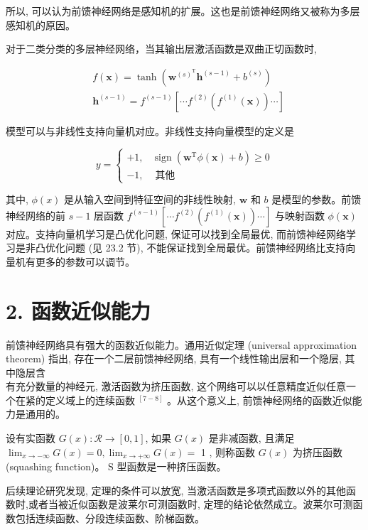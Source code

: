 \documentclass[10pt]{article}
\begin{document}
\begin{CJK*}{UTF8}{bsmi}
所以, 可以认为前馈神经网络是感知机的扩展。这也是前馈神经网络又被称为多层感知机的原因。

对于二类分类的多层神经网络，当其输出层激活函数是双曲正切函数时,


\begin{align*}
& f(\boldsymbol{x})=\tanh \left(\boldsymbol{w}^{(s)^{\mathrm{T}}} \boldsymbol{h}^{(s-1)}+b^{(s)}\right)  \tag{23.28}\\
& \boldsymbol{h}^{(s-1)}=f^{(s-1)}\left[\cdots f^{(2)}\left(f^{(1)}(\boldsymbol{x})\right) \cdots\right]
\end{align*}


模型可以与非线性支持向量机对应。非线性支持向量模型的定义是

$$
y= \begin{cases}+1, & \operatorname{sign}\left(\boldsymbol{w}^{\mathrm{T}} \phi(\boldsymbol{x})+b\right) \geqslant 0 \\ -1, & \text { 其他 }\end{cases}
$$

其中, $\phi(x)$ 是从输入空间到特征空间的非线性映射, $\boldsymbol{w}$ 和 $b$ 是模型的参数。前馈神经网络的前 $s-1$ 层函数 $f^{(s-1)}\left[\cdots f^{(2)}\left(f^{(1)}(\boldsymbol{x})\right) \cdots\right]$ 与映射函数 $\phi(\boldsymbol{x})$ 对应。支持向量机学习是凸优化问题, 保证可以找到全局最优, 而前馈神经网络学习是非凸优化问题 (见 23.2 节), 不能保证找到全局最优。前馈神经网络比支持向量机有更多的参数可以调节。

\section*{2. 函数近似能力}
前馈神经网络具有强大的函数近似能力。通用近似定理 (universal approximation theorem) 指出, 存在一个二层前馈神经网络, 具有一个线性输出层和一个隐层, 其中隐层含\\
有充分数量的神经元, 激活函数为挤压函数, 这个网络可以以任意精度近似任意一个在紧的定义域上的连续函数 ${ }^{[7-8]}$ 。从这个意义上, 前馈神经网络的函数近似能力是通用的。

设有实函数 $G(x): \mathcal{R} \rightarrow[0,1]$, 如果 $G(x)$ 是非减函数, 且满足 $\lim _{x \rightarrow-\infty} G(x)=0, \lim _{x \rightarrow+\infty} G(x)=$ 1 , 则称函数 $G(x)$ 为挤压函数 (squashing function)。 $\mathrm{S}$ 型函数是一种挤压函数。

后续理论研究发现, 定理的条件可以放宽, 当激活函数是多项式函数以外的其他函数时,或者当被近似函数是波莱尔可测函数时, 定理的结论依然成立。波莱尔可测函数包括连续函数、分段连续函数、阶梯函数。


\end{CJK*}
\end{document}
